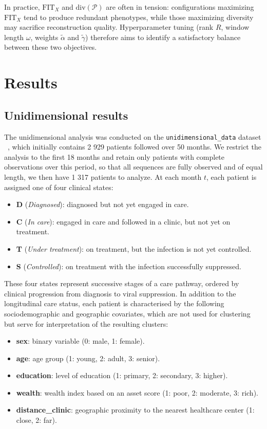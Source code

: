 \documentclass[pdflatex,sn-mathphys-num,referee,lineno]{sn-jnl}
\newcommand{\code}[1]{\texttt{#1}}
\begin{document}
In practice, $\text{FIT}_X$ and $\mathrm{div}(\mathcal{P})$ are often in tension: configurations maximizing $\text{FIT}_X$ tend to produce redundant phenotypes, while those maximizing diversity may sacrifice reconstruction quality.
Hyperparameter tuning (rank $R$, window length $\omega$, weights $\tilde{\alpha}$ and $\tilde{\gamma}$) therefore aims to identify a satisfactory balance between these two objectives.

\section{Results}\label{sec:results}

\subsection{Unidimensional results}\label{sec:uni_res}

The unidimensional analysis was conducted on the \code{unidimensional\_data} dataset ~\citep{larmarange_analyseR}, which initially contains 2 929 patients followed over 50 months.
We restrict the analysis to the first 18 months and retain only patients with complete observations over this period, so that all sequences are fully observed and of equal length, we then have 1 317 patients to analyze.
At each month $t$, each patient is assigned one of four clinical states:
\begin{itemize}
    \item \textbf{D} (\textit{Diagnosed}): diagnosed but not yet engaged in care.
    \item \textbf{C} (\textit{In care}): engaged in care and followed in a clinic, but not yet on treatment.
    \item \textbf{T} (\textit{Under treatment}): on treatment, but the infection is not yet controlled.
    \item \textbf{S} (\textit{Controlled}): on treatment with the infection successfully suppressed.
\end{itemize}
These four states represent successive stages of a care pathway, ordered by clinical progression from diagnosis to viral suppression.
In addition to the longitudinal care status, each patient is characterised by the following sociodemographic and geographic covariates, which are not used for clustering but serve for interpretation of the resulting clusters:
\begin{itemize}
    \item \textbf{sex}: binary variable (0: male, 1: female).
    \item \textbf{age}: age group (1: young, 2: adult, 3: senior).
    \item \textbf{education}: level of education (1: primary, 2: secondary, 3: higher).
    \item \textbf{wealth}: wealth index based on an asset score (1: poor, 2: moderate, 3: rich).
    \item \textbf{distance\_clinic}: geographic proximity to the nearest healthcare center (1: close, 2: far).
\end{itemize}
\end{document}
